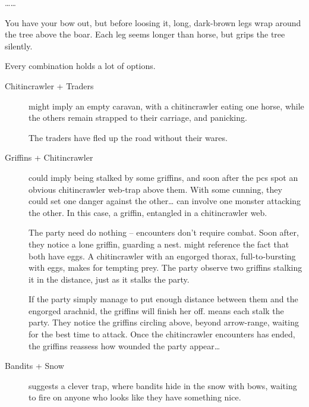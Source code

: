 \begin{multicols}{2}
  \ldots\ldots

\begin{speechtext}
  You have your bow out, but before loosing it, long, dark-brown legs wrap around the tree above the boar.
  Each leg seems longer than horse, but grips the tree silently.
\end{speechtext}

Every combination holds a lot of options.

\begin{description}
  \item[Chitincrawler + Traders]
  might imply an empty caravan, with a chitincrawler eating one horse, while the others remain strapped to their carriage, and panicking.

  The traders have fled up the road without their wares.
  \item[Griffins + Chitincrawler]
  \ifcase\value{season}\relax\or
  could imply being stalked by some griffins, and soon after the \glspl{pc} spot an obvious chitincrawler web-trap above them.
  With some cunning, they could set one danger against the other\ldots
  \or
  can involve one monster attacking the other.
  In this case, a griffin, entangled in a chitincrawler web.

  The party need do nothing -- encounters don't require combat.
  Soon after, they notice a lone griffin, guarding a nest.
  \or
  might reference the fact that both have eggs.
  A chitincrawler with an engorged thorax, full-to-bursting with eggs, makes for tempting prey.
  The party observe two griffins stalking it in the distance, just as it stalks the party.

  If the party simply manage to put enough distance between them and the engorged arachnid, the griffins will finish her off.
  \else%
  means each stalk the party.
  They notice the griffins circling above, beyond arrow-range, waiting for the best time to attack.
  Once the chitincrawler encounters has ended, the griffins reassess how wounded the party appear\ldots
  \fi
  \item[Bandits + Snow]
  suggests a clever trap, where bandits hide in the snow with bows, waiting to fire on anyone who looks like they have something nice.
\end{description}

\end{multicols}

